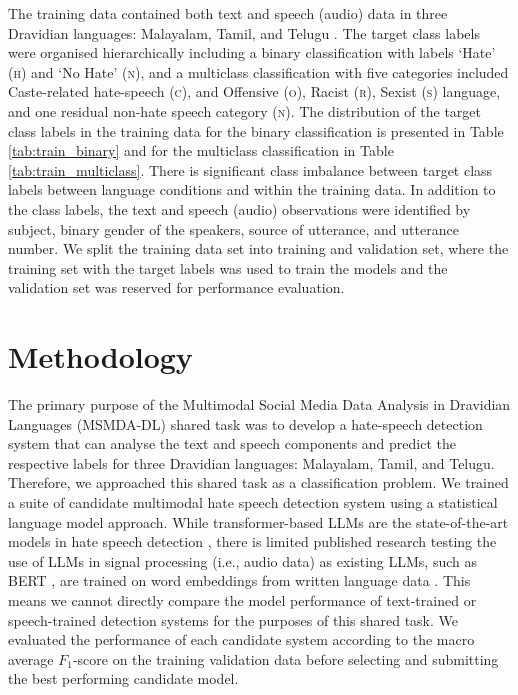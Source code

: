 \documentclass[11pt]{article}
\begin{document}
    The training data contained both text and speech (audio) data in three Dravidian languages: Malayalam, Tamil, and Telugu \cite{sreelakshmi_detection_2024}. The target class labels were organised hierarchically including a binary classification with labels `Hate' (\textsc{h}) and `No Hate' (\textsc{n}), and a multiclass classification with five categories included Caste-related hate-speech (\textsc{c}), and Offensive (\textsc{o}), Racist (\textsc{r}), Sexist (\textsc{s}) language, and one residual non-hate speech category (\textsc{n}). The distribution of the target class labels in the training data for the binary classification is presented in Table \ref{tab:train_binary} and for the multiclass classification in Table \ref{tab:train_multiclass}. There is significant class imbalance between target class labels between language conditions and within the training data. In addition to the class labels, the text and speech (audio) observations were identified by subject, binary gender of the speakers, source of utterance, and utterance number. We split the training data set into training and validation set, where the training set with the target labels was used to train the models and the validation set was reserved for performance evaluation.

\section{Methodology}
\label{sec:methodology}

    The primary purpose of the Multimodal Social Media Data Analysis in Dravidian Languages (MSMDA-DL) shared task was to develop a hate-speech detection system that can analyse the text and speech components and predict the respective labels for three Dravidian languages: Malayalam, Tamil, and Telugu. Therefore, we approached this shared task as a classification problem. We trained a suite of candidate multimodal hate speech detection system using a statistical language model approach. While transformer-based LLMs are the state-of-the-art models in hate speech detection \cite{chakravarthi_overview_2024}, there is limited published research testing the use of LLMs in signal processing (i.e., audio data) as existing LLMs, such as BERT \cite{devlin_bert_2019}, are trained on word embeddings from written language data \cite{verma_towards_2024}. This means we cannot directly compare the model performance of text-trained or speech-trained detection systems for the purposes of this shared task. We evaluated the performance of each candidate system according to the macro average $F_1$-score on the training validation data before selecting and submitting the best performing candidate model.
 
\end{document}
